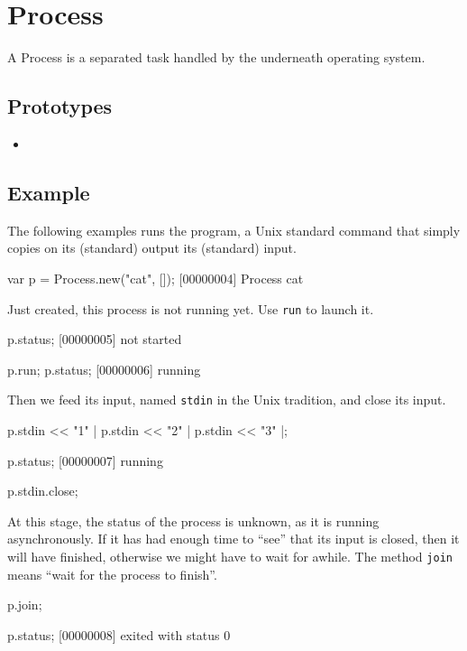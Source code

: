 \section{Process}

A Process is a separated task handled by the underneath operating
system.

\subsection{Prototypes}
\begin{itemize}
\item {}
\end{itemize}

\subsection{Example}

The following examples runs the  program, a Unix standard
command that simply copies on its (standard) output its (standard)
input.

\begin{urbiscript}
var p = Process.new("cat", []);
[00000004] Process cat
\end{urbiscript}

\noindent
Just created, this process is not running yet.  Use \lstinline|run| to
launch it.

\begin{urbiscript}
p.status;
[00000005] not started

p.run;
p.status;
[00000006] running
\end{urbiscript}

\noindent
Then we feed its input, named \lstinline|stdin| in the Unix
tradition, and close its input.

\begin{urbiscript}
p.stdin << "1\n" |
p.stdin << "2\n" |
p.stdin << "3\n" |;

p.status;
[00000007] running

p.stdin.close;
\end{urbiscript}

\noindent
At this stage, the status of the process is unknown, as it is running
asynchronously.  If it has had enough time to ``see'' that its input
is closed, then it will have finished, otherwise we might have to wait
for awhile.  The method \lstinline|join| means ``wait for the process
to finish''.

\begin{urbiscript}
p.join;

p.status;
[00000008] exited with status 0
\end{urbiscript}

